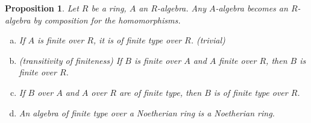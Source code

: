 \documentclass[DIV=14,parskip=half]{scrartcl}
\newtheorem{prop}{Proposition}[subsection]
\theoremstyle{definition}
\begin{document}
\begin{prop}
 Let $R$ be a ring, $A$ an $R$-algebra. Any $A$-algebra becomes an $R$-algebra by composition for the homomorphisms.
 \begin{enumerate}[a)]
  \item If $A$ is finite over $R$, it is of finite type over $R$. \checkmark (trivial)
  \item (transitivity of finiteness) If $B$ is finite over $A$ and $A$ finite over $R$, then $B$ is finite over $R$.
  \item If $B$ over $A$ and $A$ over $R$ are of finite type, then $B$ is of finite type over $R$.
  \item An algebra of finite type over a Noetherian ring is a Noetherian ring.
 \end{enumerate}

\end{prop}
\end{document}
